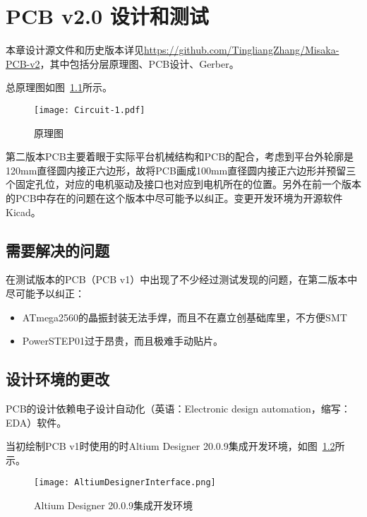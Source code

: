 \chapter{PCB v2.0 设计和测试}
\label{cha:PCB-v2}

本章设计源文件和历史版本详见\url{https://github.com/TingliangZhang/Misaka-PCB-v2}，其中包括分层原理图、PCB设计、Gerber。

总原理图如图~\ref{fig:Circuit-1}所示。

\begin{figure}[htbp]
    \centering
    \texttt{[image: Circuit-1.pdf]}
    \caption{原理图}
    \label{fig:Circuit-1}
\end{figure}

第二版本PCB主要着眼于实际平台机械结构和PCB的配合，考虑到平台外轮廓是120mm直径圆内接正六边形，故将PCB画成100mm直径圆内接正六边形并预留三个固定孔位，对应的电机驱动及接口也对应到电机所在的位置。另外在前一个版本的PCB中存在的问题在这个版本中尽可能予以纠正。变更开发环境为开源软件Kicad。

\section{需要解决的问题}

在测试版本的PCB（PCB v1）中出现了不少经过测试发现的问题，在第二版本中尽可能予以纠正：

\begin{itemize}
    \item ATmega2560的晶振封装无法手焊，而且不在嘉立创基础库里，不方便SMT
    \item PowerSTEP01过于昂贵，而且极难手动贴片。
\end{itemize}

\section{设计环境的更改}

PCB的设计依赖电子设计自动化（英语：Electronic design automation，缩写：EDA）软件。

当初绘制PCB v1时使用的时Altium Designer 20.0.9集成开发环境，如图~\ref{fig:AltiumDesignerInterface}所示。

\begin{figure}[htbp]
    \centering
    \texttt{[image: AltiumDesignerInterface.png]}
    \caption{Altium Designer 20.0.9集成开发环境}
    \label{fig:AltiumDesignerInterface}
\end{figure}

